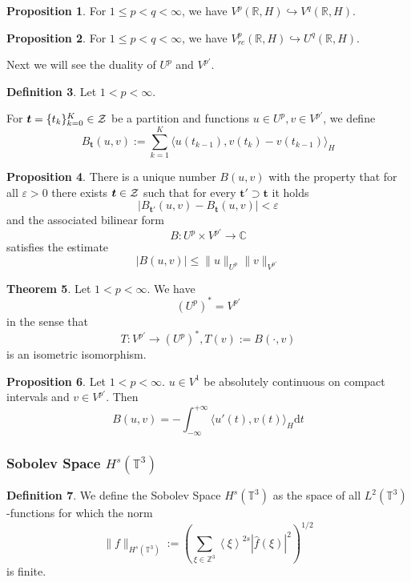\documentclass{article}
\theoremstyle{definition}
\newtheorem{definition}{Definition}[subsection]
\newtheorem{proposition}[definition]{Proposition}
\newtheorem{theorem}[definition]{Theorem}
\theoremstyle{remark}
\newcommand{\dif}{\mathrm{d}}
\begin{document}
\begin{proposition}
For $1\le p<q<\infty$, we have $V^p(\mathbb{R},H)\hookrightarrow V^q(\mathbb{R},H)$. 
\end{proposition}

\begin{proposition}
For $1\le p<q<\infty$, we have $V_{rc}^p(\mathbb{R},H)\hookrightarrow U^q(\mathbb{R},H)$. 
\end{proposition}

Next we will see the duality of $U^p$ and $V^{p'}$. 
\begin{definition}
Let $1<p<\infty$. 

For $\bm{t}=\{t_k\}_{k=0}^K\in{\cal Z}$ be a partition and functions $u\in U^p,v\in V^{p'}$, we define
$$B_{\bm{t}}(u,v):=\sum_{k=1}^K\langle u(t_{k-1}),v(t_k)-v(t_{k-1})\rangle_H$$
\end{definition}

\begin{proposition}
There is a unique number $B(u,v)$ with the property that for all $\varepsilon>0$ there exists $\bm{t}\in{\cal Z}$ such that for every $\bm{t}'\supset\bm{t}$ it holds
$$\left|B_{\bm{t}'}(u,v)-B_{\bm{t}}(u,v)\right|<\varepsilon$$
and the associated bilinear form
$$B:U^p\times V^{p'}\rightarrow\mathbb{C}$$
satisfies the estimate
$$\left|B(u,v)\right|\le\|u\|_{U^p}\|v\|_{V^{p'}}$$
\end{proposition}

\begin{theorem}
Let $1<p<\infty$. We have
$$(U^p)^*=V^{p'}$$
in the sense that
$$T:V^{p'}\rightarrow(U^p)^*,T(v):=B(\cdot,v)$$
is an isometric isomorphism. 
\end{theorem}

\begin{proposition}
Let $1<p<\infty$. $u\in V^1$ be absolutely continuous on compact intervals and $v\in V^{p'}$. Then
$$B(u,v)=-\int_{-\infty}^{+\infty}\langle u'(t),v(t)\rangle_H\dif t$$
\end{proposition}

\subsubsection{Sobolev Space $H^s(\mathbb{T}^3)$}
\begin{definition}
We define the Sobolev Space $H^s(\mathbb{T}^3)$ as the space of all $L^2(\mathbb{T}^3)$-functions for which the norm 
$$\|f\|_{H^s(\mathbb{T}^3)}:=\left(\sum_{\xi\in\mathbb{Z}^3}\left\langle\xi\right\rangle^{2s}|\widehat{f}(\xi)|^2\right)^{1/2}$$
is finite. 
\end{definition}
\end{document}
